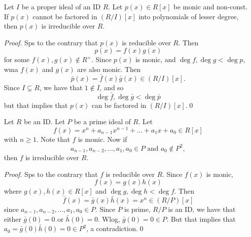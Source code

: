 \documentclass[notoc,notitlepage]{tufte-book}
\begin{document}
\begin{propo}\label{propo:polynomials_that_cannot_be_factored_over_the_ideals_is_irreducible}
  Let $I$ be a proper ideal of an ID $R$. Let $p(x) \in R[x]$ be monic and non-const.
  If $p(x)$ cannot be factored in $\left( R / I \right)[x]$  into polynomials of
  lesser degree, then $p(x)$ is irreducible over $R$.
\end{propo}

\begin{proof}
  Sps to the contrary that $p(x)$ is reducible over $R$. Then
  \begin{equation*}
    p(x) = f(x) g(x)
  \end{equation*}
  for some $f(x), g(x) \notin R^\times$. Since $p(x)$ is monic, and $\deg f, \deg g
  < \deg p$, wma $f(x)$ and $g(x)$ are also monic. Then
  \begin{equation*}
    \bar{p}(x) = \bar{f}(x) \bar{g}(x) \in \left( R/I \right)[x].
  \end{equation*}
  Since $I \subsetneq R$, we have that $1 \notin I$, and so
  \begin{equation*}
    \deg \bar{f}, \deg \bar{g} < \deg \bar{p}
  \end{equation*}
  but that implies that $p(x)$ can be factored in $\left( R/I \right)[x]$.\qed\
\end{proof}

\begin{propo}[Eisenstein's Criterion]\label{propo:eisenstein_s_criterion}
  Let $R$ be an ID. Let $P$ be a prime ideal of $R$. Let
  \begin{equation*}
    f(x) = x^n + a_{n - 1} x^{n - 1} + \hdots + a_1 x + a_0 \in R[x]
  \end{equation*}
  with $n \geq 1$. Note that $f$ is monic. Now if
  \begin{equation*}
    a_{n - 1}, a_{n - 2}, \ldots, a_1, a_0 \in P \text{ and } a_0 \notin P^2,
  \end{equation*}
  then $f$ is irreducible over $R$.
\end{propo}

\begin{proof}
  Sps to the contrary that $f$ is reducible over $R$. Since $f(x)$ is monic,
  \begin{equation*}
    f(x) = g(x) h(x)
  \end{equation*}
  where $g(x), h(x) \in R[x]$ and $\deg g, \deg h < \deg f$. Then
  \begin{equation*}
    \bar{f}(x) = \bar{g}(x) \bar{h}(x) = x^n \in (R/P)[x]
  \end{equation*}
  since $a_{n - 1}, a_{n - 2}, \ldots, a_1, a_0 \in P$.  Since $P$ is prime,
  $R/P$ is an ID, we have that either $\bar{g}(0) = 0$ or $\bar{h}(0) = 0$.
  Wlog, $\bar{g}(0) = 0 \in P$. But that implies that 
  $a_0 = \bar{g}(0)\bar{h}(0) = 0 \in P^2$, a contradiction.\qed\
\end{proof}
\end{document}
